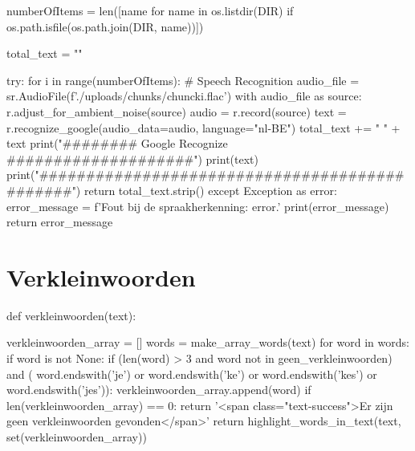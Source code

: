 \begin{python}
    numberOfItems = len([name for name in os.listdir(DIR) if os.path.isfile(os.path.join(DIR, name))])

    total_text = ""

    try:
        for i in range(numberOfItems):
        # Speech Recognition
        audio_file = sr.AudioFile(f'./uploads/chunks/chunck{i}.flac')
        with audio_file as source:
            r.adjust_for_ambient_noise(source)
            audio = r.record(source)
            text = r.recognize_google(audio_data=audio, language="nl-BE")
            total_text += " " + text
            print("######## Google Recognize ####################")
            print(text)
            print("##############################################")
            return total_text.strip()
    except Exception as error:
        error_message = f'Fout bij de spraakherkenning: {error}.'
        print(error_message)
        return error_message

\end{python}

\section{Verkleinwoorden}
\begin{python}
def verkleinwoorden(text):

    verkleinwoorden_array = []
    words = make_array_words(text)
    for word in words:
        if word is not None:
            if (len(word) > 3 and word not in geen_verkleinwoorden) and (
                word.endswith('je') or word.endswith('ke') or word.endswith('kes') or word.endswith('jes')):
                verkleinwoorden_array.append(word)
    if len(verkleinwoorden_array) == 0:
        return '<span class="text-success">Er zijn geen verkleinwoorden gevonden</span>'
    return highlight_words_in_text(text, set(verkleinwoorden_array))
\end{python}

